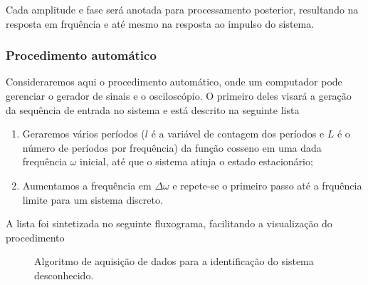 \documentclass[x11names,a4paper,12pt]{article}
\begin{document}
Cada amplitude e fase será anotada para processamento posterior, resultando na resposta em frquência e até mesmo na resposta ao impulso do sistema.

\subsubsection{Procedimento automático}

Consideraremos aqui o procedimento automático, onde um computador pode gerenciar o gerador de sinais e o osciloscópio. O primeiro deles visará a geração da sequência de entrada no sistema e está descrito na seguinte lista

\begin{enumerate}
  \item Geraremos vários períodos ($l$ é a variável de contagem dos períodos e $L$ é o número de períodos por frequência) da função cosseno em uma dada frequência $\omega$ inicial, até que o sistema atinja o estado estacionário;
  \item Aumentamos a frequência em $\Delta\omega$ e repete-se o primeiro passo até a frquência limite para um sistema discreto.
\end{enumerate}

A lista foi sintetizada no seguinte fluxograma, facilitando a visualização do procedimento

\begin{figure}[H]
  \centering
  \caption{Algoritmo de aquisição de dados para a identificação do sistema desconhecido.}
  \label{fig:data_algo}
\end{figure}
\end{document}
